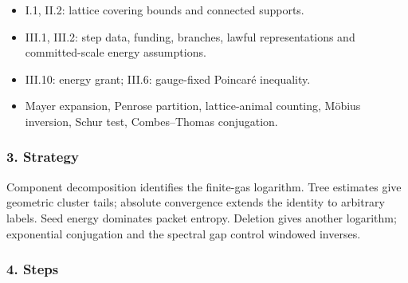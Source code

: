 \documentclass[
  letterpaper,
  11pt]{article}
\providecommand{\tightlist}{%
  \setlength{\itemsep}{0pt}\setlength{\parskip}{0pt}}
\begin{document}
\begin{itemize}
\tightlist
\item
  I.1, II.2: lattice covering bounds and connected supports.
\item
  III.1, III.2: step data, funding, branches, lawful representations and
  committed-scale energy assumptions.
\item
  III.10: energy grant; III.6: gauge-fixed Poincaré inequality.
\item
  Mayer expansion, Penrose partition, lattice-animal counting, Möbius
  inversion, Schur test, Combes--Thomas conjugation.
\end{itemize}

\subsubsection{3. Strategy}\label{strategy-7}

Component decomposition identifies the finite-gas logarithm. Tree
estimates give geometric cluster tails; absolute convergence extends the
identity to arbitrary labels. Seed energy dominates packet entropy.
Deletion gives another logarithm; exponential conjugation and the
spectral gap control windowed inverses.

\subsubsection{4. Steps}\label{steps-7}
\end{document}
